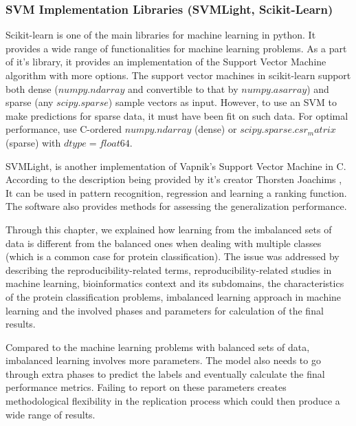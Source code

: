 \subsubsection{SVM Implementation Libraries (SVMLight, Scikit-Learn)}
  
Scikit-learn \cite{Pedregosa2011scikitlearn} is one of the main libraries for machine 
learning in python. It provides a wide range of functionalities for machine learning problems. 
As a part of it's library, it provides an implementation of the Support Vector Machine algorithm with 
more options. The support vector machines in scikit-learn support both dense 
($numpy.ndarray$ and convertible to that by $numpy.asarray$) and sparse 
(any $scipy.sparse$) sample vectors as input. However, to use an SVM to make predictions 
for sparse data, it must have been fit on such data. For optimal performance, use C-ordered 
$numpy.ndarray$ (dense) or $scipy.sparse.csr_matrix$ (sparse) with $dtype=float64$.

SVMLight, is another implementation of Vapnik's Support Vector Machine \cite{vapnik2013nature} 
in C. According  to the description being provided by it’s creator 
Thorsten Joachims \cite{joachims2002learning}, It can be used in pattern recognition, 
regression and learning a ranking function. The software also provides methods for assessing 
the generalization performance.

Through this chapter, we explained 
how learning from the imbalanced sets of data is different from the balanced ones when dealing 
with multiple classes (which is a common case for protein classification).
The issue was addressed by describing the reproducibility-related terms, 
reproducibility-related studies in machine learning, bioinformatics context and its subdomains, 
the characteristics of the protein classification problems, imbalanced learning approach 
in machine learning and the involved phases and parameters for calculation of the final results.

Compared to the machine learning problems with balanced sets of data, imbalanced learning 
involves more parameters. The model also needs to go through extra phases to predict 
the labels and eventually calculate the final performance metrics.  
Failing to report on these parameters creates methodological flexibility in the replication process 
which could then produce a wide range of results. 

